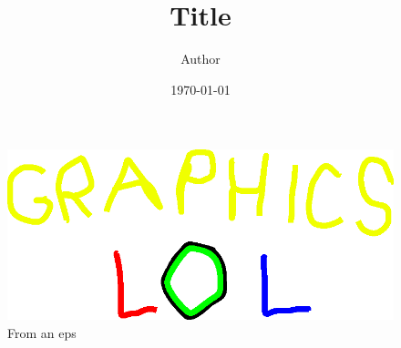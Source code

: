 \documentclass[10pt]{article}
\title{Title}
\author{Author}
\date{\today}
\begin{document}
\maketitle

\begin{figure}
  \centering
  \includegraphics[width=0.7\linewidth]{graphics-eps}
  \caption{From an eps}
  \label{fig:graphics-eps}
\end{figure}
\end{document}
